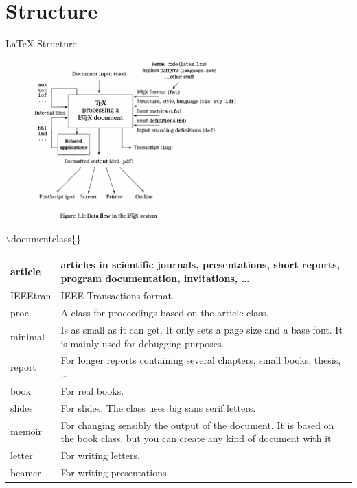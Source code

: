 \documentclass[10pt,xcolor=table]{beamer}
\begin{document}
\section{Structure}
\begin{frame}{LaTeX Structure}
\begin{figure}
\centering
\includegraphics[width=0.7\textwidth]{figs/LaTeX.png}
\end{figure}
\end{frame}


\begin{frame}{$\backslash$documentclass\{\}}

\begin{table}
\begin{tabular}{|l|p{}|}
\hline
article & articles in scientific journals, presentations, short reports, program documentation, invitations, \dots \\ \hline
IEEEtran & IEEE Transactions format.\\ \hline
proc & A class for proceedings based on the article class.\\ \hline
minimal & Is as small as it can get. It only sets a page size and a base font. It is mainly used for debugging purposes.\\ \hline
report & For longer reports containing several chapters, small books, thesis, \dots \\ \hline
book & For real books.\\ \hline
slides & For slides. The class uses big sans serif letters.\\ \hline
memoir & For changing sensibly the output of the document. It is based on the book class, but you can create any kind of document with it\\ \hline
letter & For writing letters. \\ \hline
beamer& For writing presentations \\ \hline
\end{tabular}
\end{table}
\end{frame}
\end{document}
